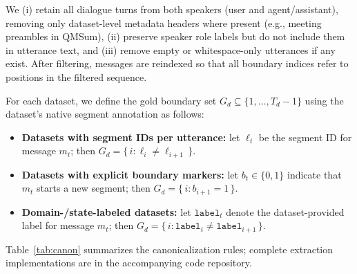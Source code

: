 We (i) retain all dialogue turns from both speakers (user and agent/assistant), removing only dataset-level metadata headers where present (e.g., meeting       
preambles in QMSum), (ii) preserve speaker role labels but do not include them in utterance text, and (iii) remove empty or whitespace-only utterances if any   
exist. After filtering, messages are reindexed so that all boundary indices refer to positions in the filtered sequence.                                        

For each dataset, we define the gold boundary set $G_d\subseteq\{1,\dots,T_d-1\}$ using the dataset's native segment
annotation as follows:
\begin{itemize}
\item \textbf{Datasets with segment IDs per utterance:} let $\ell_t$ be the segment ID for message $m_t$; then
  $G_d = \{\, i : \ell_i \ne \ell_{i+1}\,\}$.
\item \textbf{Datasets with explicit boundary markers:} let $b_t\in\{0,1\}$ indicate that $m_t$ starts a new segment;
  then $G_d = \{\, i : b_{i+1}=1\,\}$.
\item \textbf{Domain-/state-labeled datasets:} let $\texttt{label}_t$ denote the dataset-provided label for message $m_t$; then
  $G_d=\{\, i : \texttt{label}_i \ne \texttt{label}_{i+1}\,\}$.
\end{itemize}

Table~\ref{tab:canon} summarizes the canonicalization rules; complete
extraction implementations are in the accompanying code repository.


